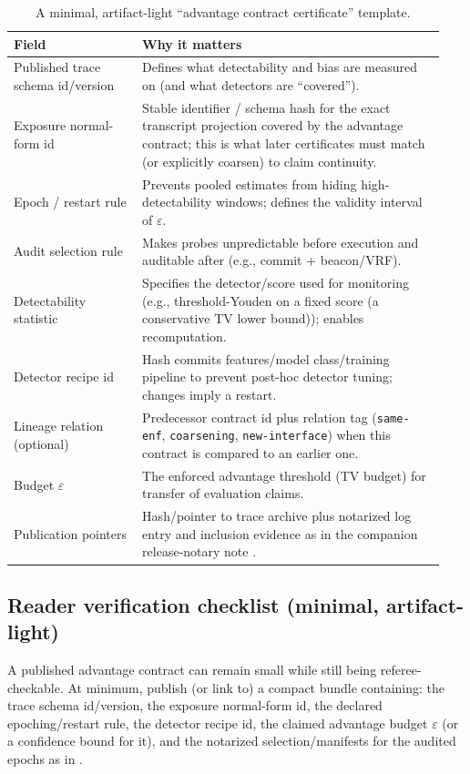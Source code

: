 \documentclass[11pt]{article}
\begin{document}
\begin{table}[t]
\centering
\begin{tabular}{@{}p{0.28\linewidth}p{0.66\linewidth}@{}}
\toprule
Field & Why it matters \\
\midrule
Published trace schema id/version & Defines what detectability and bias are measured on (and what detectors are ``covered''). \\
Exposure normal-form id & Stable identifier / schema hash for the exact transcript projection covered by the advantage contract; this is what later certificates must match (or explicitly coarsen) to claim continuity. \\
Epoch / restart rule & Prevents pooled estimates from hiding high-detectability windows; defines the validity interval of $\varepsilon$. \\
Audit selection rule & Makes probes unpredictable before execution and auditable after (e.g., commit + beacon/VRF). \\
Detectability statistic & Specifies the detector/score used for monitoring (e.g., threshold-Youden on a fixed score (a conservative TV lower bound)); enables recomputation. \\
Detector recipe id & Hash commits features/model class/training pipeline to prevent post-hoc detector tuning; changes imply a restart. \\
Lineage relation (optional) & Predecessor contract id plus relation tag (\texttt{same-enf}, \texttt{coarsening}, \texttt{new-interface}) when this contract is compared to an earlier one. \\
Budget $\varepsilon$ & The enforced advantage threshold (TV budget) for transfer of evaluation claims. \\
Publication pointers & Hash/pointer to trace archive plus notarized log entry and inclusion evidence as in the companion release-notary note \cite{series:evalnotary}. \\
\bottomrule
\end{tabular}
\caption{A minimal, artifact-light ``advantage contract certificate'' template.}
\label{tab:adv_manifest}
\end{table}

\subsection{Reader verification checklist (minimal, artifact-light)}
A published advantage contract can remain small while still being referee-checkable.
At minimum, publish (or link to) a compact bundle containing: the trace schema id/version, the exposure normal-form id, the declared epoching/restart rule,
the detector recipe id, the claimed advantage budget $\varepsilon$ (or a confidence bound for it), and the notarized selection/manifests for the audited epochs as in \cite{series:evalnotary}.
\end{document}
